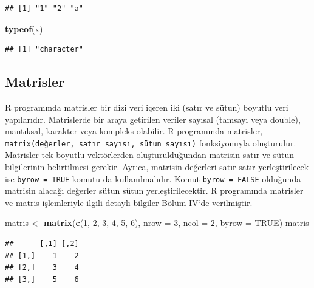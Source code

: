 \documentclass[
]{book}
\newenvironment{Shaded}{\begin{snugshade}}{\end{snugshade}}
\newcommand{\AttributeTok}[1]{\textcolor[rgb]{0.13,0.29,0.53}{#1}}
\newcommand{\ConstantTok}[1]{\textcolor[rgb]{0.56,0.35,0.01}{#1}}
\newcommand{\DecValTok}[1]{\textcolor[rgb]{0.00,0.00,0.81}{#1}}
\newcommand{\FunctionTok}[1]{\textcolor[rgb]{0.13,0.29,0.53}{\textbf{#1}}}
\newcommand{\NormalTok}[1]{#1}
\newcommand{\OtherTok}[1]{\textcolor[rgb]{0.56,0.35,0.01}{#1}}
\begin{document}
\begin{verbatim}
## [1] "1" "2" "a"
\end{verbatim}

\begin{Shaded}
\begin{Highlighting}[]
\FunctionTok{typeof}\NormalTok{(x)}
\end{Highlighting}
\end{Shaded}

\begin{verbatim}
## [1] "character"
\end{verbatim}

\subsection{Matrisler}\label{matrisler}

R programında matrisler bir dizi veri içeren iki (satır ve sütun) boyutlu veri yapılarıdır. Matrislerde bir araya getirilen veriler sayısal (tamsayı veya double), mantıksal, karakter veya kompleks olabilir. R programında matrisler, \texttt{matrix(değerler,\ satır\ sayısı,\ sütun\ sayısı)} fonksiyonuyla oluşturulur. Matrisler tek boyutlu vektörlerden oluşturulduğundan matrisin satır ve sütun bilgilerinin belirtilmesi gerekir. Ayrıca, matrisin değerleri satır satır yerleştirilecek ise \texttt{byrow\ =\ TRUE} komutu da kullanılmalıdır. Komut \texttt{byrow\ =\ FALSE} olduğunda matrisin alacağı değerler sütun sütun yerleştirilecektir. R programında matrisler ve matris işlemleriyle ilgili detaylı bilgiler Bölüm IV`de verilmiştir.

\begin{Shaded}
\begin{Highlighting}[]
\NormalTok{matris }\OtherTok{\textless{}{-}} \FunctionTok{matrix}\NormalTok{(}\FunctionTok{c}\NormalTok{(}\DecValTok{1}\NormalTok{, }\DecValTok{2}\NormalTok{, }\DecValTok{3}\NormalTok{, }\DecValTok{4}\NormalTok{, }\DecValTok{5}\NormalTok{, }\DecValTok{6}\NormalTok{), }\AttributeTok{nrow =} \DecValTok{3}\NormalTok{, }\AttributeTok{ncol =} \DecValTok{2}\NormalTok{, }\AttributeTok{byrow =} \ConstantTok{TRUE}\NormalTok{)}
\NormalTok{matris}
\end{Highlighting}
\end{Shaded}

\begin{verbatim}
##      [,1] [,2]
## [1,]    1    2
## [2,]    3    4
## [3,]    5    6
\end{verbatim}
\end{document}
